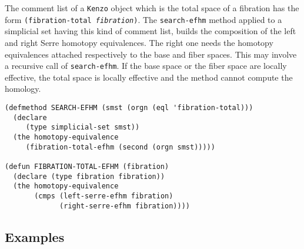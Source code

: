 The comment list of a {\tt Kenzo} object which is the total space of a fibration has the form
{\tt (fibration-total {\em fibration})}. The {\tt search-efhm} method applied to a simplicial
set having this kind of comment list, builds the composition of the left and right Serre homotopy
equivalences. The right one needs the homotopy equivalences attached respectively to the
base and  fiber spaces. This may involve a recursive call of {\tt search-efhm}.
If the base space or the fiber space
are locally effective, the total space is locally effective and the method
cannot compute the homology.
{\footnotesize\begin{verbatim}
(defmethod SEARCH-EFHM (smst (orgn (eql 'fibration-total)))
  (declare
     (type simplicial-set smst))
  (the homotopy-equivalence
     (fibration-total-efhm (second (orgn smst)))))

(defun FIBRATION-TOTAL-EFHM (fibration)
  (declare (type fibration fibration))
  (the homotopy-equivalence
       (cmps (left-serre-efhm fibration)
             (right-serre-efhm fibration))))
\end{verbatim}}

\subsection* {Examples}

